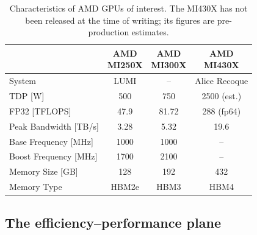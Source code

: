 \begin{center}
\begin{table}[h!]
\centering
\small
\caption{Characteristics of AMD GPUs of interest. The MI430X has not been released at the time of writing; its figures are pre-production estimates.}
\label{tab:amd}
\medskip
\begin{tabular}{l|ccc}
                          & \shortstack{AMD\\MI250X} & \shortstack{AMD\\MI300X} & \shortstack{AMD\\MI430X} \\ \hline
System                    & LUMI       & --         & Alice Recoque \\ \hline
TDP [W]                   & 500        & 750        & 2500 (est.) \\
FP32 [TFLOPS]             & 47.9       & 81.72      & 288 (fp64)  \\
Peak Bandwidth [TB/s]     & 3.28       & 5.32       & 19.6        \\
Base Frequency [MHz]      & 1000       & 1000       & --          \\
Boost Frequency [MHz]     & 1700       & 2100       & --          \\
Memory Size [GB]          & 128        & 192        & 432         \\
Memory Type               & HBM2e      & HBM3       & HBM4        \\
\end{tabular}
\end{table}
\end{center}

\subsection{The efficiency--performance plane}

